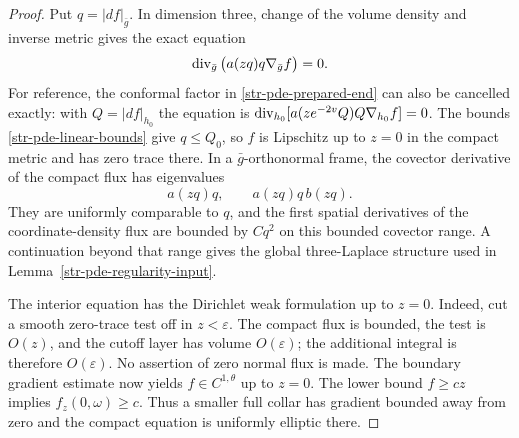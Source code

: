 \begin{proof}
Put $q=|df|_{\bar g}$. In dimension three, change of the volume
density and inverse metric gives the exact equation
\begin{equation}\label{str-pde-compact-equation}
 \operatorname{div}_{\bar g}\big(a(zq)q\nabla_{\bar g}f\big)=0.
\end{equation}
For reference, the conformal factor in
\eqref{str-pde-prepared-end} can also be cancelled exactly:
with $Q=|df|_{h_0}$ the equation is
$\operatorname{div}_{h_0}[a(ze^{-2v}Q)Q\nabla_{h_0}f]=0$.
The bounds \eqref{str-pde-linear-bounds} give $q\leq Q_0$,
so $f$ is Lipschitz up to $z=0$ in the compact metric and has
zero trace there. In a $\bar g$-orthonormal frame, the covector
derivative of the compact flux has eigenvalues
\[
 a(zq)q,\qquad a(zq)q\,b(zq).
\]
They are uniformly comparable to $q$, and the first spatial
derivatives of the coordinate-density flux are bounded by
$Cq^2$ on this bounded covector range. A continuation beyond
that range gives the global three-Laplace structure used in
Lemma~\ref{str-pde-regularity-input}.

The interior equation has the Dirichlet weak formulation up
to $z=0$. Indeed, cut a smooth zero-trace test off in
$z<\varepsilon$. The compact flux is bounded, the test is
$O(z)$, and the cutoff layer has volume $O(\varepsilon)$;
the additional integral is therefore $O(\varepsilon)$.
No assertion of zero normal flux is made.
The boundary gradient estimate now yields $f\in C^{1,\theta}$
up to $z=0$. The lower bound $f\geq cz$ implies
$f_z(0,\omega)\geq c$. Thus a smaller full collar has gradient
bounded away from zero and the compact equation is uniformly
elliptic there.


\end{proof}
